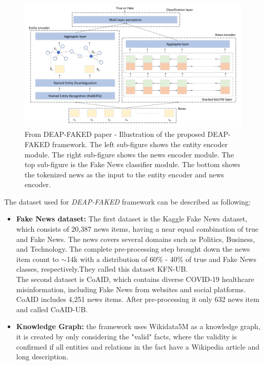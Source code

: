 \documentclass[10pt, english]{report}
\begin{document}
\begin{figure}[H]
	\centering
	\includegraphics[scale=0.45]{img/deap_fake_framework.png}
	\caption{From DEAP-FAKED paper - Illustration of the proposed DEAP-FAKED framework. The left sub-figure shows the entity encoder module. The right sub-figure shows the news encoder module. The top sub-figure is the Fake News classifier module. The bottom shows the tokenized news as the input to the entity encoder and news encoder.}
\end{figure}

The dataset used for \textit{DEAP-FAKED} framework can be described as following:

\begin{itemize}
\item \textbf{Fake News dataset:} The first dataset is the Kaggle Fake News dataset, which consists of 20,387 news items, having a near equal combination of true and Fake News. The news covers several domains such as Politics, Business, and Technology.
The complete pre-processing step brought down the news item count to  $\sim$14k with a distribution of 60\% - 40\% of true and Fake News classes, respectively.They called this dataset KFN-UB.\\
The second dataset is CoAID, which contains diverse COVID-19 healthcare misinformation, including Fake News from websites and social platforms. CoAID includes 4,251 news items. After pre-processing it only 632 news item and called CoAID-UB.
\item \textbf{Knowledge Graph:} the framework uses Wikidata5M as a knowledge graph, it is created by only considering the "valid" facts, where the validity is confirmed if all entities and relations in the fact have a Wikipedia article and long description.
\end{itemize}
\end{document}
